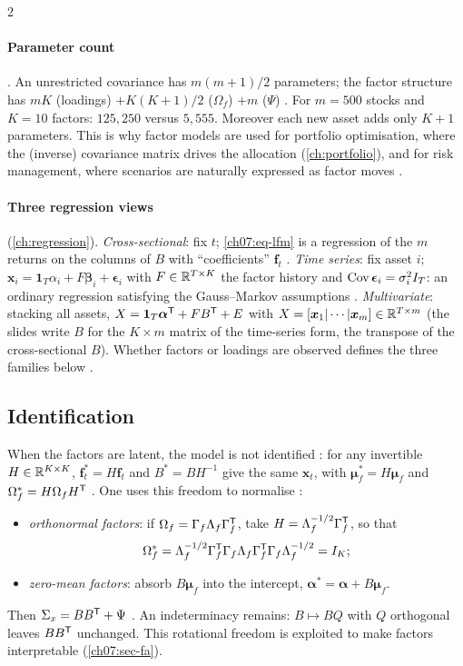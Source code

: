 \begin{paracol}{2}
\paragraph{Parameter count} . An unrestricted covariance has $m(m+1)/2$ parameters; the factor
structure has $mK$ (loadings) $+K(K+1)/2$ ($\Omega_f$) $+m$ ($\Psi$) . For $m=500$ stocks and $K=10$
factors: $125{,}250$ versus $5{,}555$. Moreover each new asset adds only $K+1$ parameters. This is why factor models
are used for portfolio optimisation, where the (inverse) covariance matrix drives the allocation
(\cref{ch:portfolio}), and for risk management, where scenarios are naturally expressed as factor moves
.

\paragraph{Three regression views} (\cref{ch:regression}).
\emph{Cross-sectional}: fix $t$; \eqref{ch07:eq-lfm} is a regression of the $m$ returns on the columns of $B$ with
``coefficients'' $\bm f_t$ . \emph{Time series}: fix asset $i$; $\bm x_i=\bm1_T\alpha_i+F\bm\beta_i+\bm\epsilon_i$
with $F\in\mathbb{R}^{T\times K}$ the factor history and $\operatorname{Cov}\bm\epsilon_i=\sigma_i^2I_T$: an ordinary regression satisfying the
Gauss--Markov assumptions . \emph{Multivariate}: stacking all assets,
$X=\bm1_T\bm\alpha^{\mathsf T}+FB^{\mathsf T}+E$ with $X=[\bm x_1|\cdots|\bm x_m]\in\mathbb{R}^{T\times m}$  (the slides write $B$ for the
$K\times m$ matrix of the time-series form, the transpose of the cross-sectional $B$).
Whether factors or loadings are observed defines the three families below .

\subsection{Identification}\label{ch07:sec-ident}
When the factors are latent, the model is not identified : for any invertible $H\in\mathbb{R}^{K\times K}$,
$\bm f_t^*=H\bm f_t$ and $B^*=BH^{-1}$ give the same $\bm x_t$, with $\bm\mu_f^*=H\bm\mu_f$ and $\Omega_f^*=H\Omega_fH^{\mathsf T}$
. One uses this freedom to normalise :
\begin{itemize}
  \item \emph{orthonormal factors}: if $\Omega_f=\Gamma_f\Lambda_f\Gamma_f^{\mathsf T}$, take $H=\Lambda_f^{-1/2}\Gamma_f^{\mathsf T}$, so that
        \[\Omega_f^*=\Lambda_f^{-1/2}\Gamma_f^{\mathsf T}\Gamma_f\Lambda_f\Gamma_f^{\mathsf T}\Gamma_f\Lambda_f^{-1/2}=I_K;\]
  \item \emph{zero-mean factors}: absorb $B\bm\mu_f$ into the intercept, $\bm\alpha^*=\bm\alpha+B\bm\mu_f$.
\end{itemize}
Then $\Sigma_x=BB^{\mathsf T}+\Psi$ . An indeterminacy remains: $B\mapsto BQ$ with $Q$ orthogonal leaves $BB^{\mathsf T}$
unchanged. This rotational freedom is exploited to make factors interpretable (\cref{ch07:sec-fa}).


\end{paracol}
